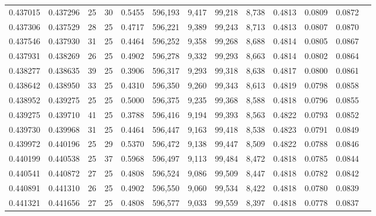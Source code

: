 \begin{tabular}{rrrrrrrrrrrrr}
0.437015 & 0.437296 &    25 &  30 &                                     0.5455 & 596,193 &   9,417 &  99,218 &   8,738 & 0.4813 & 0.0809 & 0.0872 \\
0.437306 & 0.437529 &    28 &  25 &                                     0.4717 & 596,221 &   9,389 &  99,243 &   8,713 & 0.4813 & 0.0807 & 0.0870 \\
0.437546 & 0.437930 &    31 &  25 &                                     0.4464 & 596,252 &   9,358 &  99,268 &   8,688 & 0.4814 & 0.0805 & 0.0867 \\
0.437931 & 0.438269 &    26 &  25 &                                     0.4902 & 596,278 &   9,332 &  99,293 &   8,663 & 0.4814 & 0.0802 & 0.0864 \\
0.438277 & 0.438635 &    39 &  25 &                                     0.3906 & 596,317 &   9,293 &  99,318 &   8,638 & 0.4817 & 0.0800 & 0.0861 \\
0.438642 & 0.438950 &    33 &  25 &                                     0.4310 & 596,350 &   9,260 &  99,343 &   8,613 & 0.4819 & 0.0798 & 0.0858 \\
0.438952 & 0.439275 &    25 &  25 &                                     0.5000 & 596,375 &   9,235 &  99,368 &   8,588 & 0.4818 & 0.0796 & 0.0855 \\
0.439275 & 0.439710 &    41 &  25 &                                     0.3788 & 596,416 &   9,194 &  99,393 &   8,563 & 0.4822 & 0.0793 & 0.0852 \\
0.439730 & 0.439968 &    31 &  25 &                                     0.4464 & 596,447 &   9,163 &  99,418 &   8,538 & 0.4823 & 0.0791 & 0.0849 \\
0.439972 & 0.440196 &    25 &  29 &                                     0.5370 & 596,472 &   9,138 &  99,447 &   8,509 & 0.4822 & 0.0788 & 0.0846 \\
0.440199 & 0.440538 &    25 &  37 &                                     0.5968 & 596,497 &   9,113 &  99,484 &   8,472 & 0.4818 & 0.0785 & 0.0844 \\
0.440541 & 0.440872 &    27 &  25 &                                     0.4808 & 596,524 &   9,086 &  99,509 &   8,447 & 0.4818 & 0.0782 & 0.0842 \\
0.440891 & 0.441310 &    26 &  25 &                                     0.4902 & 596,550 &   9,060 &  99,534 &   8,422 & 0.4818 & 0.0780 & 0.0839 \\
0.441321 & 0.441656 &    27 &  25 &                                     0.4808 & 596,577 &   9,033 &  99,559 &   8,397 & 0.4818 & 0.0778 & 0.0837 \\

\end{tabular}

